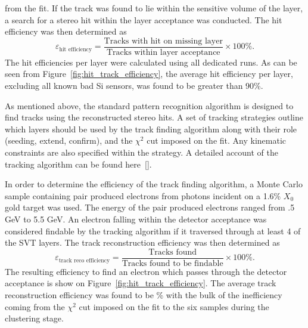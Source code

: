 from the fit. If the track was found to lie within the sensitive volume
of the layer, a search for a stereo hit within the layer acceptance was 
conducted.  The hit efficiency was then determined as
\[
    \varepsilon_{\mbox{hit efficiency}} = \frac{\mbox{Tracks with hit on missing layer}}
                                            {\mbox{Tracks within layer acceptance}} \times 100 \%.
\]
The hit efficiencies per layer were calculated using all dedicated runs. As 
can be seen from Figure~\ref{fig:hit_track_efficiency}, the average hit efficiency
per layer, excluding all known bad Si sensors, was found to be greater than
90\%.

As mentioned above, the standard pattern recognition algorithm is designed to 
find tracks using the reconstructed stereo hits.  A set of tracking strategies
outline which layers should be used by the track finding algorithm along
with their role (seeding, extend, confirm), and the $\chi^2$ cut imposed 
on the fit. Any kinematic constraints are also specified within the strategy.
A detailed account of the tracking algorithm can be found  here~\ref{}.

In order to determine the efficiency of the track finding algorithm, a Monte
Carlo sample containing pair produced electrons from photons incident on 
a 1.6\% $X_0$ gold target was used.  The energy of the pair produced electrons
ranged from .5 GeV to 5.5 GeV. An electron falling within the detector 
acceptance was considered findable by the tracking algorithm if it 
traversed through at least 4 of the SVT layers. The track reconstruction
efficiency was then determined as
\[
    \varepsilon_{\mbox{track reco efficiency}} = \frac{\mbox{Tracks found}}
                                            {\mbox{Tracks found to be findable}} \times 100 \%.
\]
The resulting efficiency to find an electron which passes through the detector
acceptance is show on Figure~\ref{fig:hit_track_efficiency}. The average track
reconstruction efficiency was found to be \% with the bulk of the inefficiency
coming from the $\chi^2$ cut imposed on the fit to the six samples during
the clustering stage.

